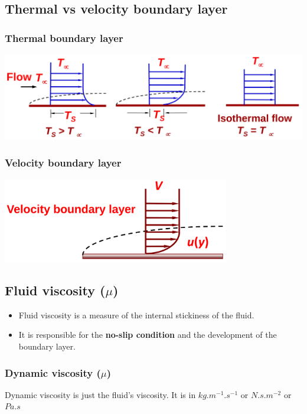 \documentclass[11pt]{article}
\begin{document}
\subsection{Thermal vs velocity boundary layer}
\label{sec:org9106869}

\subsubsection{Thermal boundary layer}
\label{sec:org9682191}
\begin{center}
\includegraphics[width=.9\linewidth]{./images/thermal-boundary-layer-all-three-flows.png}
\end{center}

\subsubsection{Velocity boundary layer}
\label{sec:orgadfb7dc}
\begin{center}
\includegraphics[height=10em]{./images/velocity-boundary-layer-simplified-diagram.png}
\end{center}

\subsection{Fluid viscosity (\(\mu\))}
\label{sec:org3e6f5bc}
\begin{itemize}
\item Fluid viscosity is a measure of the internal stickiness of the fluid.
\item It is responsible for the \textbf{no-slip condition} and the development of the boundary layer.
\end{itemize}

\subsubsection{Dynamic viscosity (\(\mu\))}
\label{sec:org7d62578}
Dynamic viscosity is just the fluid's viscosity. It is in \(\unit{kg.m^{-1}.s^{-1}}\) or \(\unit{N.s.m^{-2}}\) or \(\unit{Pa.s}\)
\end{document}
